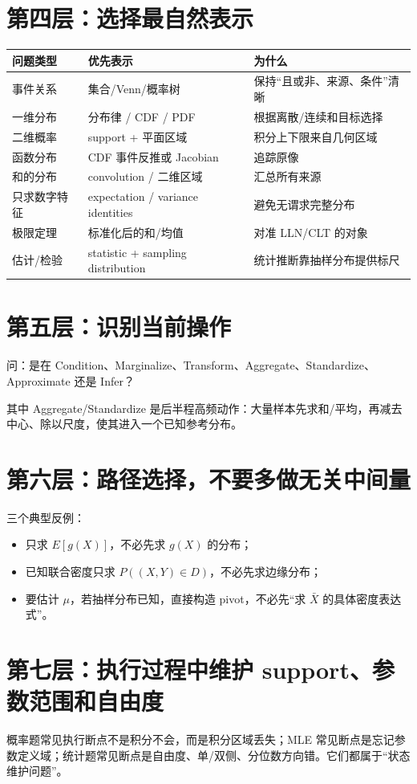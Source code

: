 \documentclass[11pt,a4paper,openany]{ctexbook}
\begin{document}
\section{第四层：选择最自然表示}
\begin{longtable}{L{3.3cm}L{4.7cm}L{\dimexpr\linewidth-8.97cm\relax}}
\toprule
\textbf{问题类型} & \textbf{优先表示} & \textbf{为什么}\\
\midrule
事件关系 & 集合/Venn/概率树 & 保持“且或非、来源、条件”清晰\\
一维分布 & 分布律 / CDF / PDF & 根据离散/连续和目标选择\\
二维概率 & support + 平面区域 & 积分上下限来自几何区域\\
函数分布 & CDF 事件反推或 Jacobian & 追踪原像\\
和的分布 & convolution / 二维区域 & 汇总所有来源\\
只求数字特征 & expectation / variance identities & 避免无谓求完整分布\\
极限定理 & 标准化后的和/均值 & 对准 LLN/CLT 的对象\\
估计/检验 & statistic + sampling distribution & 统计推断靠抽样分布提供标尺\\
\bottomrule
\end{longtable}

\section{第五层：识别当前操作}
问：是在 Condition、Marginalize、Transform、Aggregate、Standardize、Approximate 还是 Infer？

其中 Aggregate/Standardize 是后半程高频动作：大量样本先求和/平均，再减去中心、除以尺度，使其进入一个已知参考分布。

\section{第六层：路径选择，不要多做无关中间量}
三个典型反例：
\begin{itemize}
  \item 只求 $E[g(X)]$，不必先求 $g(X)$ 的分布；
  \item 已知联合密度只求 $P((X,Y)\in D)$，不必先求边缘分布；
  \item 要估计 $\mu$，若抽样分布已知，直接构造 pivot，不必先“求 $\bar X$ 的具体密度表达式”。
\end{itemize}

\section{第七层：执行过程中维护 support、参数范围和自由度}
概率题常见执行断点不是积分不会，而是积分区域丢失；MLE 常见断点是忘记参数定义域；统计题常见断点是自由度、单/双侧、分位数方向错。它们都属于“状态维护问题”。
\end{document}
